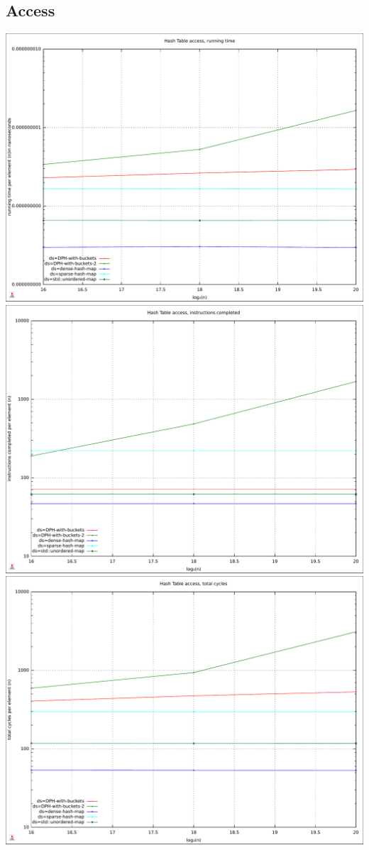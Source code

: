 \documentclass{article}
\begin{document}
\subsection*{Access}
\centering
\includegraphics[width=\linewidth]{img/hash_access_time}
\includegraphics[width=\linewidth]{img/hash_access_instructions}
\includegraphics[width=\linewidth]{img/hash_access_cycles}
\end{document}
